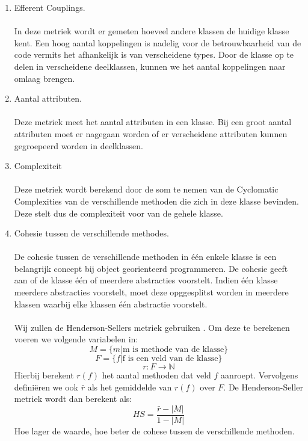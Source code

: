 \begin{enumerate}
	\item 
		Efferent Couplings.
		\\
		\\
		In deze metriek wordt er gemeten hoeveel andere klassen de huidige klasse kent. Een hoog aantal koppelingen is nadelig voor de betrouwbaarheid van de code vermits het afhankelijk is van verscheidene types. Door de klasse op te delen in verscheidene deelklassen, kunnen we het aantal koppelingen naar omlaag brengen.
	\item
		Aantal attributen.
		\\
		\\
		Deze metriek meet het aantal attributen in een klasse. Bij een groot aantal attributen moet er nagegaan worden of er verscheidene attributen kunnen gegroepeerd worden in deelklassen.
	
	\item
		Complexiteit
		\\
		\\
		Deze metriek wordt berekend door de som te nemen van de Cyclomatic Complexities van de verschillende methoden die zich in deze klasse bevinden. Deze stelt dus de complexiteit voor van de gehele klasse.
		
	\item 
	{
		Cohesie tussen de verschillende methodes.
		\\
		\\
		De cohesie tussen de verschillende methoden in \'{e}\'{e}n enkele klasse is een belangrijk concept bij object georienteerd programmeren. De cohesie geeft aan of de klasse \'{e}\'{e}n of meerdere abstracties voorstelt. Indien \'{e}\'{e}n klasse meerdere abstracties voorstelt, moet deze opggesplitst worden in meerdere klassen waarbij elke klassen \'{e}\'{e}n abstractie voorstelt.
		\\
		\\
		Wij zullen de Henderson-Sellers metriek gebruiken \cite{HendersonSellers}. Om deze te berekenen voeren we volgende variabelen in: 
		$$ M = \{ m | \text{m is methode van de klasse} \} $$
		$$ F = \{ f | \text{f is een veld van de klasse} \} $$
		$$ r : F \rightarrow \mathbb{N} $$
Hierbij berekent $r(f)$ het aantal methoden dat veld $f$ aanroept. Vervolgens defini\"{e}ren we ook $\bar{r}$ als het gemiddelde van $r(f)$ over $F$. De Henderson-Seller metriek wordt dan berekent als:
		$$ HS = \frac{\bar{r} - |M|}{1 - |M|} $$
		Hoe lager de waarde, hoe beter de cohese tussen de verschillende methoden.
	} %
\end{enumerate}
